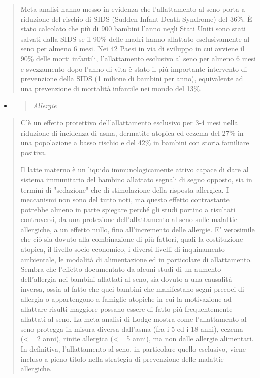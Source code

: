 \documentclass[]{article}
\begin{document}
\begin{quote}
Meta-analisi hanno messo in evidenza che l'allattamento al seno porta a
riduzione del rischio di SIDS (Sudden Infant Death Syndrome) del 36\%. È
stato calcolato che più di 900 bambini l'anno negli Stati Uniti sono
stati salvati dalla SIDS se il 90\% delle madri hanno allattato
esclusivamente al seno per almeno 6 mesi. Nei 42 Paesi in via di
sviluppo in cui avviene il 90\% delle morti infantili, l'allattamento
esclusivo al seno per almeno 6 mesi e svezzamento dopo l'anno di vita è
stato il più importante intervento di prevenzione della SIDS (1 milione
di bambini per anno), equivalente ad una prevenzione di mortalità
infantile nei mondo del 13\%.
\end{quote}

\begin{itemize}
\item
  \begin{quote}
  \emph{Allergie }
  \end{quote}
\end{itemize}

\begin{quote}
C'è un effetto protettivo dell'allattamento esclusivo per 3-4 mesi nella
riduzione di incidenza di asma, dermatite atopica ed eczema del 27\% in
una popolazione a basso rischio e del 42\% in bambini con storia
familiare positiva.

Il latte materno è un liquido immunologicamente attivo capace di dare al
sistema immunitario del bambino allattato segnali di segno opposto, sia
in termini di "sedazione" che di stimolazione della risposta allergica.
I meccanismi non sono del tutto noti, ma questo effetto contrastante
potrebbe almeno in parte spiegare perché gli studi portino a risultati
controversi, da una protezione dell'allattamento al seno sulle malattie
allergiche, a un effetto nullo, fino all'incremento delle allergie. E'
verosimile che ciò sia dovuto alla combinazione di più fattori, quali la
costituzione atopica, il livello socio-economico, i diversi livelli di
inquinamento ambientale, le modalità di alimentazione ed in particolare
di allattamento. Sembra che l'effetto documentato da alcuni studi di un
aumento dell'allergia nei bambini allattati al seno, sia dovuto a una
causalità inversa, ossia al fatto che quei bambini che manifestano segni
precoci di allergia o appartengono a famiglie atopiche in cui la
motivazione ad allattare risulti maggiore possano essere di fatto più
frequentemente allattati al seno. La meta-analisi di Lodge mostra come
l'allattamento al seno protegga in misura diversa dall'asma (fra i 5 ed
i 18 anni), eczema (\textless{}= 2 anni), rinite allergica (\textless{}=
5 anni), ma non dalle allergie alimentari. In definitiva, l'allattamento
al seno, in particolare quello esclusivo, viene incluso a pieno titolo
nella strategia di prevenzione delle malattie allergiche.
\end{quote}
\end{document}
